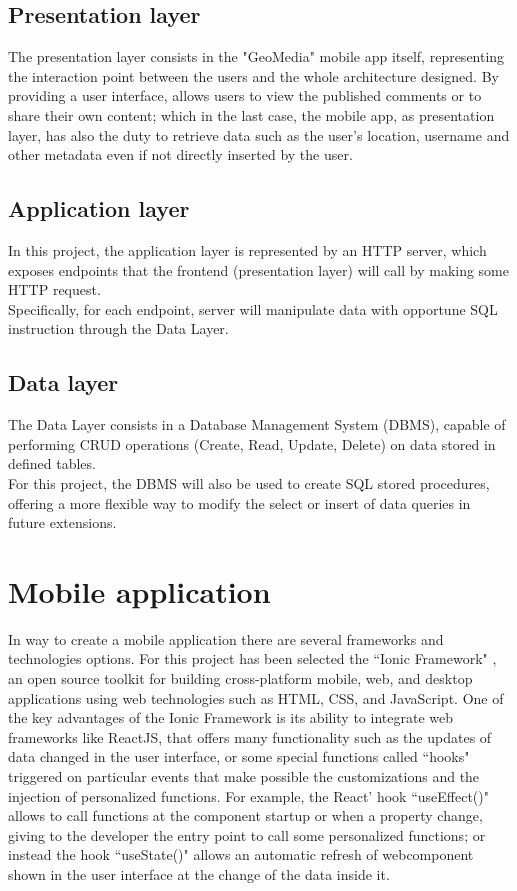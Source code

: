 \documentclass[conference]{IEEEtran}
\begin{document}
\subsection{Presentation layer}
The presentation layer consists in the "GeoMedia" mobile app itself, representing the interaction point between the users and the whole architecture designed.
By providing a user interface, allows users to view the published comments or to share their own content; which in the last case, the mobile app, as presentation layer, has also the duty to retrieve data such as the user's location, username and other metadata even if not directly inserted by the user.
\subsection{Application layer}

In this project, the application layer is represented by an HTTP server, which exposes endpoints that the frontend (presentation layer) will call by making some HTTP request.
\\
Specifically, for each endpoint, server will manipulate data with opportune SQL instruction through the Data Layer.

\subsection{Data layer}

The Data Layer consists in a Database Management System (DBMS), capable of performing CRUD operations (Create, Read, Update, Delete) on data stored in defined tables.
\\
For this project, the DBMS will also be used to create SQL stored procedures, offering a more flexible way to modify the select or insert of data queries in future extensions.


\section{Mobile application}
In way to create a mobile application there are several frameworks and technologies options. For this project has been selected the ``Ionic Framework" \cite{b1}, an open source toolkit for building cross-platform mobile, web, and desktop applications using web technologies such as HTML, CSS, and JavaScript.
One of the key advantages of the Ionic Framework is its ability to integrate web frameworks like ReactJS, that offers many functionality such as the updates of data changed in the user interface, or some special functions called ``hooks" triggered on particular events that make possible the customizations and the injection of personalized functions.
For example, the React' hook ``useEffect()" allows to call functions at the component startup or when a property change, giving to the developer the entry point to call some personalized functions; or instead the hook ``useState()" allows an automatic refresh of webcomponent shown in the user interface at the change of the data inside it.
\end{document}
